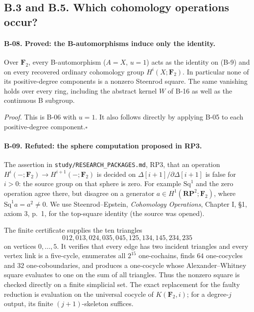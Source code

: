 \subsection{B.3 and B.5. Which cohomology operations occur?}

\paragraph{B-08. Proved: the B-automorphisms induce only the identity.}
Over $\mathbf F_2$, every B-automorphism ($A=X$, $u=1$) acts as
the identity on (B-9) and on every recovered ordinary cohomology
group $H^i(X;\mathbf F_2)$. In particular none of its positive-degree
components is a nonzero Steenrod square. The same vanishing holds
over every ring, including the abstract kernel $W$ of B-16 as well
as the continuous B subgroup.

\emph{Proof.} This is B-06 with $u=1$. It also follows directly by
applying B-05 to each positive-degree component.\hfill$\square$

\paragraph{B-09. Refuted: the sphere computation proposed in RP3.}
The assertion in \texttt{study/RESEARCH\_PACKAGES.md}, RP3, that an
operation $H^i(-;\mathbf F_2)\to H^{i+1}(-;\mathbf F_2)$ is decided
on $\Delta[i+1]/\partial\Delta[i+1]$ is false for $i>0$:
the source group on that sphere is zero. For example $\mathrm{Sq}^1$
and the zero operation agree there, but disagree on a generator
$a\in H^1(\mathbf{RP}^2;\mathbf F_2)$, where
$\mathrm{Sq}^1a=a^2\ne0$. We use Steenrod--Epstein,
\emph{Cohomology Operations}, Chapter I, \S1, axiom 3, p.~1,
for the top-square identity (the source was opened).

The finite certificate supplies the ten triangles
\[
 012,013,024,035,045,125,134,145,234,235
\]
on vertices $0,\ldots,5$. It verifies that every edge has two
incident triangles and every vertex link is a five-cycle, enumerates
all $2^{15}$ one-cochains, finds $64$ one-cocycles and $32$
one-coboundaries, and produces a one-cocycle whose Alexander--Whitney
square evaluates to one on the sum of all triangles.
Thus the nonzero square is checked directly on a finite simplicial
set. The exact replacement for the faulty reduction is evaluation
on the universal cocycle of $K(\mathbf F_2,i)$; for a degree-$j$
output, its finite $(j+1)$-skeleton suffices.

